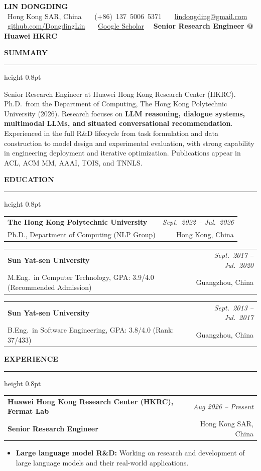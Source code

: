 \documentclass[11pt,a4paper]{article}
\makeatletter
\newcommand{\Section}[1]{%
    \vspace{0.50em}
    {\color{Accent}\bfseries\large #1}\par
    \vspace{0.26em}
    {\color{RuleGray}\hrule height 0.8pt}
    \vspace{0.42em}
}
\newcommand{\Entry}[5][0.16em]{%
\begin{tabularx}{\linewidth}{@{}Xr@{}}
\textbf{#2} & \textit{#3}\\
{\small #4} & {\small #5}
\end{tabularx}\vspace{#1}
}
\makeatother
\begin{document}
\color{BodyText}

\begin{center}
    {\fontsize{23}{23}\selectfont\bfseries\color{Accent} LIN DONGDING}\\[3pt]
    {\small
    \faMapMarker*\ Hong Kong SAR, China \ \textbullet\ 
    \faPhone\ (+86)~137~5006~5371 \ \textbullet\ 
    \faEnvelope\ \href{mailto:lindongding@gmail.com}{lindongding@gmail.com}\\[2pt]
    \faGithub\ \href{https://github.com/DongdingLin}{github.com/DongdingLin}
    \ \textbullet\
    \faGraduationCap\ \href{https://scholar.google.com/citations?user=JM4i0R8AAAAJ}{Google Scholar}
    \ \textbullet\
    \textbf{Senior Research Engineer @ Huawei HKRC}
    }
\end{center}

\Section{SUMMARY}
Senior Research Engineer at Huawei Hong Kong Research Center (HKRC). Ph.D.\ from the Department of Computing, The Hong Kong Polytechnic University (2026). Research focuses on \textbf{LLM reasoning, dialogue systems, multimodal LLMs, and situated conversational recommendation}. Experienced in the full R\&D lifecycle from task formulation and data construction to model design and experimental evaluation, with strong capability in engineering deployment and iterative optimization. Publications appear in ACL, ACM MM, AAAI, TOIS, and TNNLS.

\Section{EDUCATION}
\Entry{The Hong Kong Polytechnic University}{Sept.\ 2022 -- Jul.\ 2026}{Ph.D., Department of Computing (NLP Group)}{Hong Kong, China}
\Entry{Sun Yat-sen University}{Sept.\ 2017 -- Jul.\ 2020}{M.Eng.\ in Computer Technology, GPA: 3.9/4.0 (Recommended Admission)}{Guangzhou, China}
\Entry[-0.5em]{Sun Yat-sen University}{Sept.\ 2013 -- Jul.\ 2017}{B.Eng.\ in Software Engineering, GPA: 3.8/4.0 (Rank: 37/433)}{Guangzhou, China}

\Section{EXPERIENCE}
\Entry{Huawei Hong Kong Research Center (HKRC), Fermat Lab}{Aug 2026 -- Present}{\textbf{Senior Research Engineer}}{Hong Kong SAR, China}
\begin{itemize}
    \item \textbf{Large language model R\&D:} Working on research and development of large language models and their real-world applications.
\end{itemize}
\end{document}
